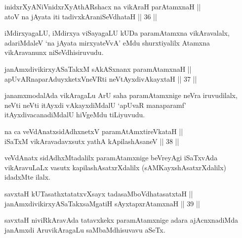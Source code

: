 \begin{shl}
inidxrXyANiVnidxrXyAthARshacx na vikAraH parAtamxnaH || \\
atoV na jAyata iti tadivxkAraniSeVdhataH \hfill || 36 ||  
\end{shl}

\begin{artha}
iMdirxyagaLU, iMdirxya viSayagaLU kUDa paramAtamxna vikAravalalx,
adariMdaleV `na jAyata mirxyateVvA' eMdu shurxtiyalilx Atamxna
vikAravanunx niSeVdhisiruvudu.
\end{artha}

\begin{shl}
janAmxdivikirxyASaTakxM sAkASxnanx paramAtamxnaH || \\
apUvARnaparAduyxketxVneVRti neVtAyxdivAkayxtaH \hfill || 37 ||  
\end{shl}

\begin{artha}
janamxmodalAda vikAragaLu ArU saha paramAtamxnige neVra iruvudilalx,
neVti neVti itAyxdi vAkayxdiMdalU `apUvaR manaparamf'
itAyxdivacanadiMdalU hiVgeMdu tiLiyuvudu.
\end{artha}


\begin{shl}
na ca veVdAnatxsidAdhxnetxV paramAtAmxtireVkataH || \\
iSaTxM vikAravadavxsutx yathA kApilashAsaneV \hfill || 38 || 
\end{shl}

\begin{artha}
veVdAnatx sidAdhxMtadalilx paramAtamxnige beVreyAgi iSaTxvAda
vikAravuLaLx vasutx kapilashAsatxrXdalilx (sAMKayxshAsatxrXdalilx) idadxMte ilalx.
\end{artha}


\begin{shl}
savxtaH kUTasathxtatatxvXsayx tadasaMboVdhatasatxtaH || \\
janAmxdivikirxyASaTakxsaMgatiH sAyxtapxrAtamxnaH \hfill || 39 ||  
\end{shl}

\begin{artha}
savxtaH niviRkAravAda tatavxkekx paramAtamxnige adara ajAcnxnadiMda
janAmxdi AruvikAragaLu saMbaMdhisuvavu aSeTx.
\end{artha}

